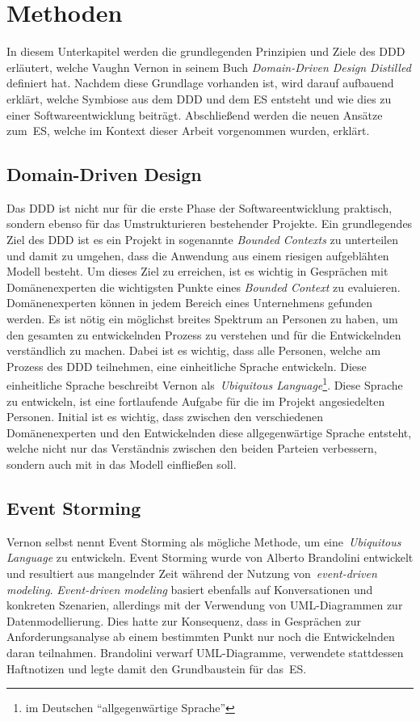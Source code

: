 \section{Methoden}\label{sec:event-storming}
In diesem Unterkapitel werden die grundlegenden Prinzipien und Ziele des \ac{DDD} erläutert, welche Vaughn Vernon in seinem Buch
\textit{Domain-Driven Design Distilled} definiert hat\cite*{dddd}.
Nachdem diese Grundlage vorhanden ist, wird darauf aufbauend erklärt, welche Symbiose aus dem \ac{DDD} und dem \ac{ES} entsteht und wie
dies zu einer Softwareentwicklung beiträgt.
Abschließend werden die neuen Ansätze zum~\ac{ES}, welche im Kontext dieser Arbeit vorgenommen wurden, erklärt.

\subsection{Domain-Driven Design}\label{subsec:domain-driven-design}
Das \ac*{DDD} ist nicht nur für die erste Phase der Softwareentwicklung praktisch, sondern ebenso für das Umstrukturieren bestehender Projekte.
Ein grundlegendes Ziel des \ac{DDD} ist es ein Projekt in sogenannte \textit{Bounded Contexts} zu unterteilen und damit zu umgehen, dass
die Anwendung aus einem riesigen aufgeblähten Modell besteht.
Um dieses Ziel zu erreichen, ist es wichtig in Gesprächen mit Domänenexperten die wichtigsten Punkte eines \textit{Bounded Context} zu evaluieren.
Domänenexperten können in jedem Bereich eines Unternehmens gefunden werden.
Es ist nötig ein möglichst breites Spektrum an Personen zu haben, um den gesamten zu entwickelnden Prozess zu verstehen und für die Entwickelnden verständlich zu machen.
Dabei ist es wichtig, dass alle Personen, welche am Prozess des \ac{DDD} teilnehmen, eine einheitliche Sprache entwickeln.
Diese einheitliche Sprache beschreibt Vernon als~\textit{Ubiquitous Language}\footnote{im Deutschen ``allgegenwärtige Sprache''}\cite*{dddd}.
Diese Sprache zu entwickeln, ist eine fortlaufende Aufgabe für die im Projekt angesiedelten Personen.
Initial ist es wichtig, dass zwischen den verschiedenen Domänenexperten und den Entwickelnden diese allgegenwärtige Sprache entsteht, welche
nicht nur das Verständnis zwischen den beiden Parteien verbessern, sondern auch mit in das Modell einfließen soll.

\subsection{Event Storming}\label{subsec:allgemein}
Vernon selbst nennt Event Storming als mögliche Methode, um eine~\textit{Ubiquitous Language}\cite*{dddd} zu entwickeln.
Event Storming wurde von Alberto Brandolini entwickelt und resultiert aus mangelnder Zeit während der Nutzung von~\textit{event-driven modeling}.
\textit{Event-driven modeling} basiert ebenfalls auf Konversationen und konkreten Szenarien, allerdings mit der Verwendung von \ac{UML}-Diagrammen zur Datenmodellierung.
Dies hatte zur Konsequenz, dass in Gesprächen zur Anforderungsanalyse ab einem bestimmten Punkt nur noch die Entwickelnden daran teilnahmen.
Brandolini verwarf \ac{UML}-Diagramme, verwendete stattdessen Haftnotizen und legte damit den Grundbaustein für das~\ac{ES}\cite*{dddd}.

